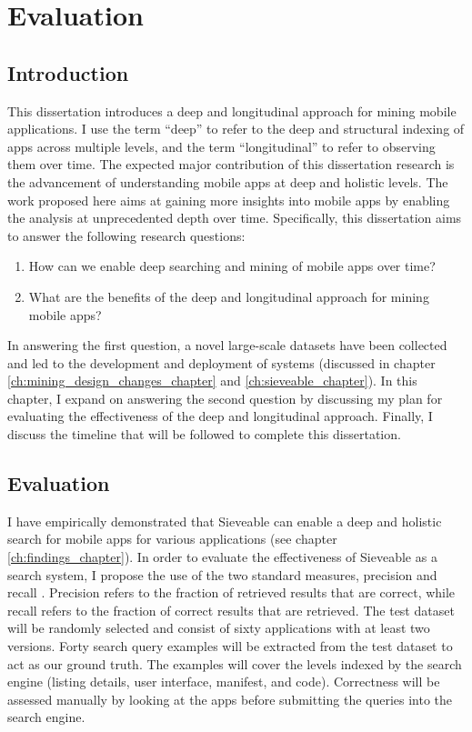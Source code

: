 \chapter{Evaluation}

\section{Introduction}
\label{ch:propsal}
This dissertation introduces a deep and longitudinal approach for mining mobile applications.
I use the term ``deep'' to refer to the deep and structural indexing of apps across multiple levels, and the term ``longitudinal'' to refer to observing them over time.
The expected major contribution of this dissertation research is the advancement of understanding mobile apps at deep and holistic levels.
The work proposed here aims at gaining more insights into mobile apps by enabling the analysis at unprecedented depth over time.
Specifically, this dissertation aims to answer the following research questions:
\begin{enumerate}
	\item How can we enable deep searching and mining of mobile apps over time?
	\item What are the benefits of the deep and longitudinal approach for mining mobile apps?
\end{enumerate}

In answering the first question, a novel large-scale datasets have been collected and led to the development and deployment of systems (discussed in chapter \ref{ch:mining_design_changes_chapter} and \ref{ch:sieveable_chapter}).
In this chapter, I expand on answering the second question by discussing my plan for evaluating the effectiveness of the deep and longitudinal approach.
Finally, I discuss the timeline that will be followed to complete this dissertation.

\section{Evaluation}
I have empirically demonstrated that Sieveable can enable a deep and holistic search for mobile apps for various applications (see chapter \ref{ch:findings_chapter}).
In order to evaluate the effectiveness of Sieveable as a search system, I propose the use of the two standard measures, precision and recall \cite{manning_2008_intro_to_IR}.
Precision refers to the fraction of retrieved results that are correct, while recall refers to the fraction of correct results that are retrieved.
The test dataset will be randomly selected and consist of sixty applications with at least two versions.
Forty search query examples will be extracted from the test dataset to act as our ground truth.
The examples will cover the levels indexed by the search engine (listing details, user interface, manifest, and code).
Correctness will be assessed manually by looking at the apps before submitting the queries into the search engine.

